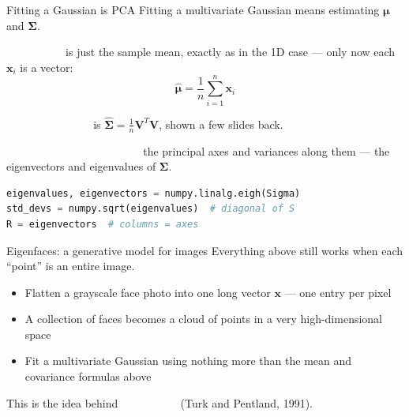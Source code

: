 \documentclass[aspectratio=169]{beamer}
\renewcommand{\textbf}[1]{\textcolor{white}{\bfseries #1}}
\begin{document}
\begin{frame}[fragile]{Fitting a Gaussian is PCA}
Fitting a multivariate Gaussian means estimating $\boldsymbol\mu$ and $\boldsymbol\Sigma$.

\vspace{0.5em}
\textbf{The mean} is just the sample mean, exactly as in the 1D case --- only now each $\mathbf{x}_i$ is a vector:
\[
\hat{\boldsymbol\mu} = \frac{1}{n}\sum_{i=1}^n \mathbf{x}_i
\]

\vspace{0.5em}
\textbf{The covariance} is $\hat{\boldsymbol\Sigma} = \frac{1}{n}\mathbf{V}^T\mathbf{V}$, shown a few slides back.

\vspace{0.5em}
\textbf{What you usually want:} the principal axes and variances along them --- the eigenvectors and eigenvalues of $\boldsymbol\Sigma$.

\begin{lstlisting}[language=Python]
eigenvalues, eigenvectors = numpy.linalg.eigh(Sigma)
std_devs = numpy.sqrt(eigenvalues)  # diagonal of S
R = eigenvectors  # columns = axes
\end{lstlisting}
\end{frame}

\begin{frame}[c]{Eigenfaces: a generative model for images}
Everything above still works when each ``point'' is an entire image.

\vspace{0.5em}
\begin{itemize}
    \item Flatten a grayscale face photo into one long vector $\mathbf{x}$ --- one entry per pixel
    \item A collection of faces becomes a cloud of points in a very high-dimensional space
    \item Fit a multivariate Gaussian using nothing more than the mean and covariance formulas above
\end{itemize}

\vspace{0.5em}
This is the idea behind \textbf{eigenfaces} (Turk and Pentland, 1991).
\end{frame}
\end{document}
